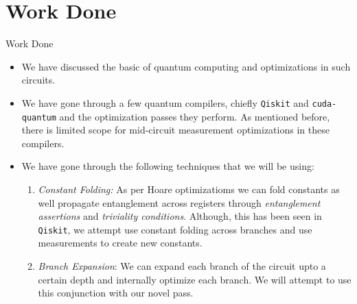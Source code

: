 \documentclass[10pt]{beamer}
\begin{document}

\section{Work Done}


\begin{frame}{Work Done}
  \begin{itemize}
    \item We have discussed the basic of quantum computing and optimizations in such circuits.

      \pause

    \item We have gone through a few quantum compilers, chiefly \texttt{Qiskit} and \texttt{cuda-quantum} and the optimization passes they perform. As mentioned before, there is limited scope for mid-circuit measurement optimizations in these compilers. 

      \pause

    \item We have gone through the following techniques that we will be using:
      \begin{enumerate}
        \item \emph{Constant Folding:} As per Hoare optimizatioms we can fold constants as well propagate entanglement across registers through \emph{entanglement assertions} and \emph{triviality conditions}. Although, this has been seen in \texttt{Qiskit}, we attempt use constant folding across branches and use measurements to create new constants. \cite{hoare}

        \item \emph{Branch Expansion}: We can expand each branch of the circuit upto a certain depth and internally optimize each branch. We will attempt to use this conjunction with our novel pass. \cite{branch}
      \end{enumerate}
  \end{itemize}
\end{frame}

\end{document}
